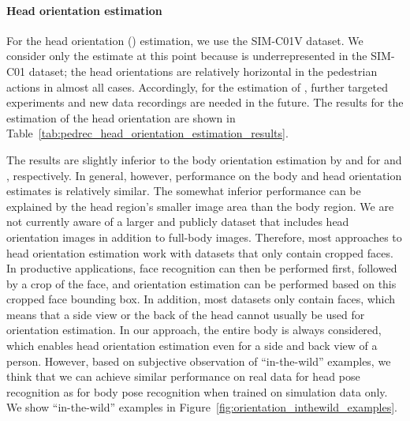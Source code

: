 \documentclass[a4paper, 10pt, conference]{ieeeconf}
\begin{document}
\paragraph{Head orientation estimation}
For the head orientation () estimation, we use the SIM-C01V dataset. We consider only the  estimate at this point because  is underrepresented in the SIM-C01 dataset; the head orientations are relatively horizontal in the pedestrian actions in almost all cases. Accordingly, for the estimation of , further targeted experiments and new data recordings are needed in the future. The results for the estimation of the head  orientation are shown in Table~\ref{tab:pedrec_head_orientation_estimation_results}.

\begin{table}[!htbp]
  \centering
  \caption[PedRecNet: Head orientation results]{PedRecNet: Head orientation test results for .}
  \label{tab:pedrec_head_orientation_estimation_results}
\end{table}

The results are slightly inferior to the body orientation estimation by  and  for  and , respectively. In general, however, performance on the body and head orientation estimates is relatively similar. The somewhat inferior performance can be explained by the head region's smaller image area than the body region. 
We are not currently aware of a larger and publicly dataset that includes head orientation images in addition to full-body images. Therefore, most approaches to head orientation estimation work with datasets that only contain cropped faces. In productive applications, face recognition can then be performed first, followed by a crop of the face, and orientation estimation can be performed based on this cropped face bounding box. In addition, most datasets only contain faces, which means that a side view or the back of the head cannot usually be used for orientation estimation. In our approach, the entire body is always considered, which enables head orientation estimation even for a side and back view of a person. However, based on subjective observation of \enquote{in-the-wild} examples, we think that we can achieve similar performance on real data for head pose recognition as for body pose recognition when trained on simulation data only. We show \enquote{in-the-wild} examples in Figure~\ref{fig:orientation_inthewild_examples}.
\end{document}
